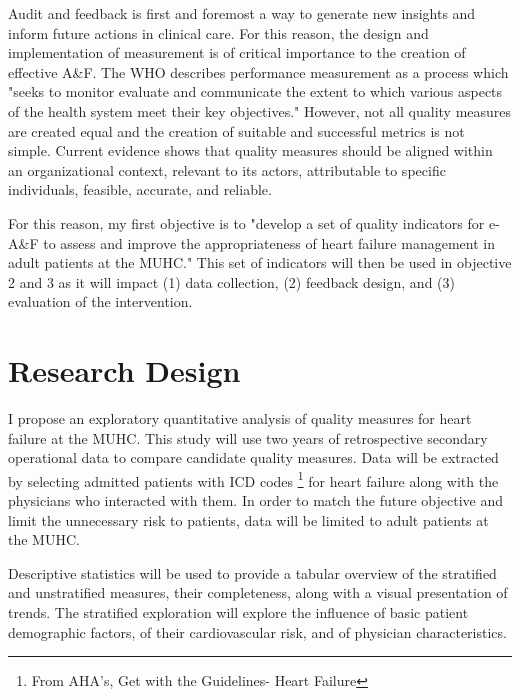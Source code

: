 Audit and feedback is first and foremost a way to generate new insights and inform future actions in clinical care. For this reason, the design and implementation of measurement is of critical importance to the creation of effective A\&F. The WHO describes performance measurement as a process which "seeks to monitor evaluate and communicate the extent to which various aspects of the health system meet their key objectives."\cite{smith2009performance} However, not all quality measures are created equal and the creation of suitable and successful metrics is not simple. Current evidence shows that quality measures should be aligned within an organizational context, relevant to its actors, attributable to specific individuals, feasible, accurate, and reliable.\cite{polanczyk2019quality}

For this reason, my first objective is to "develop a set of quality indicators for e-A\&F to assess and improve the appropriateness of heart failure management in adult patients at the MUHC." This set of indicators will then be used in objective 2 and 3 as it will impact (1) data collection, (2) feedback design, and (3) evaluation of the intervention.

\section{Research Design}
I propose an exploratory quantitative analysis of quality measures for heart failure at the MUHC. This study will use two years of retrospective secondary operational data to compare candidate quality measures. Data will be extracted by selecting admitted patients with ICD codes \footnote{From AHA's, Get with the Guidelines\textcopyright - Heart Failure} for heart failure along with the physicians who interacted with them. In order to match the future objective and limit the unnecessary risk to patients, data will be limited to adult patients at the MUHC.


Descriptive statistics will be used to provide a tabular overview of the stratified and unstratified measures, their completeness, along with a visual presentation of trends. The stratified exploration will explore the influence of basic patient demographic factors, of their cardiovascular risk, and of physician characteristics. 

